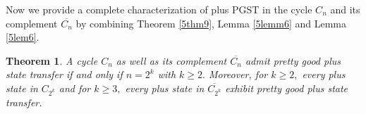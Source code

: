\documentclass[12pt,a4paper]{article}
\newtheorem{thm}{Theorem}
\newtheorem{lem}{Lemma}
\def \e {{\bf e}}
\def \x {{\bf x}}
\def \e {{\mathbf e}}
\newcommand{\ob}[1]{\left(#1\right)}
\newcommand{\tb}[1]{\left[#1\right]}
\begin{document}
 Now we provide a complete characterization of plus PGST in the cycle $C_n$ and its complement $\overline{C_n}$ by combining Theorem \ref{5thm9}, Lemma \ref{5lemm6} and Lemma \ref{5lem6}. 
 \begin{thm}\label{5th10}
      A cycle $C_n$ as well as its complement $\overline{C_n}$ admit pretty good plus state transfer if and only if $n=2^k$ with $k\geq 2.$ Moreover, for $k\geq 2,$ every plus state in $C_{2^k}$ and for $k\geq 3,$ every plus state in $\overline{C_{2^k}}$ exhibit pretty good plus state transfer.
 \end{thm}


\end{document}
